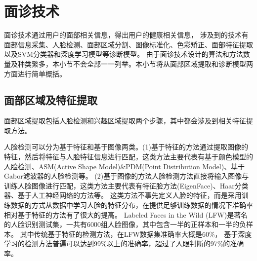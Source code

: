 \section{面诊技术}
面诊技术通过用户的面部相关信息，得出用户的健康相关信息，
涉及到的技术有面部信息采集、人脸检测、面部区域分割、图像标准化、色彩矫正、面部特征提取以及SVM分类器和深度学习模型等诊断模型\cite{宋海贝2018中医面诊信息自动识别方法研究进展, 林锋2019中医面诊系统调研报告}。
由于面诊技术设计的算法和方法数量及种类繁多，本小节不会全部一一列举。本小节将从面部区域提取和诊断模型两方面进行简单概括。

\subsection{面部区域及特征提取}
面部区域提取包括人脸检测和兴趣区域提取两个步骤，其中都会涉及到相关特征提取方法。

人脸检测可以分为基于特征和基于图像两类。(1)基于特征的方法通过提取图像的特征，然后将特征与人脸特征信息进行匹配，这类方法主要代表有基于颜色模型的人脸检测\cite{dhivakar2015face}、ASM(Active Shape Model)\&PDM(Point Distribution Model)\cite{kumar2019face}、基于Gabor滤波器的人脸检测\cite{sharif2011face}等。
(2)基于图像的方法人脸检测方法直接将输入图像与训练人脸图像进行匹配，这类方法主要代表有特征脸方法(EigenFace)\cite{mulyono2019performance}、Haar分类器\cite{priadana2019face}、基于人工神经网络\cite{farfade2015multi}的方法等。
这类方法不事先定义人脸的特征，而是采用训练数据的方式从数据中学习人脸的特征分布，在提供足够训练数据的情况下准确率相对基于特征的方法有了很大的提高。
Labeled Faces in the Wild (LFW)是著名的人脸识别测试集，一共有6000组人脸图像，其中包含一半的正样本和一半的负样本。
其中传统基于特征的检测方法，在LFW数据集准确率大概是60\%， 基于深度学习的检测方法普遍可以达到99\%以上的准确率，超过了人眼判断的97\%的准确率\cite{sun2015deeply}。





